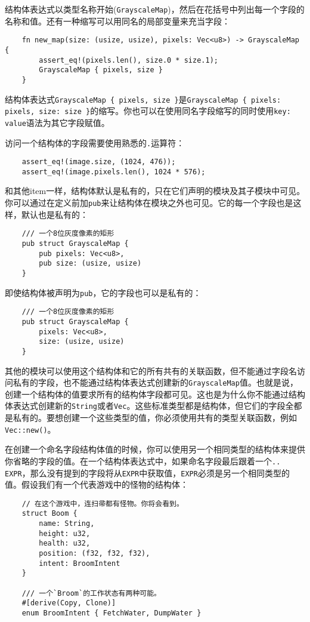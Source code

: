 结构体表达式以类型名称开始(\texttt{GrayscaleMap})，然后在花括号中列出每一个字段的名称和值。还有一种缩写可以用同名的局部变量来充当字段：
\begin{verbatim}
    fn new_map(size: (usize, usize), pixels: Vec<u8>) -> GrayscaleMap {
        assert_eq!(pixels.len(), size.0 * size.1);
        GrayscaleMap { pixels, size }
    }
\end{verbatim}

结构体表达式\texttt{GrayscaleMap \{ pixels, size \}}是\texttt{GrayscaleMap \{ pixels: pixels, size: size \}}的缩写。你也可以在使用同名字段缩写的同时使用\texttt{key: value}语法为其它字段赋值。

访问一个结构体的字段需要使用熟悉的\texttt{.}运算符：
\begin{verbatim}
    assert_eq!(image.size, (1024, 476));
    assert_eq!(image.pixels.len(), 1024 * 576);
\end{verbatim}

和其他item一样，结构体默认是私有的，只在它们声明的模块及其子模块中可见。你可以通过在定义前加\texttt{pub}来让结构体在模块之外也可见。它的每一个字段也是这样，默认也是私有的：
\begin{verbatim}
    /// 一个8位灰度像素的矩形
    pub struct GrayscaleMap {
        pub pixels: Vec<u8>,
        pub size: (usize, usize)
    }
\end{verbatim}

即使结构体被声明为\texttt{pub}，它的字段也可以是私有的：
\begin{verbatim}
    /// 一个8位灰度像素的矩形
    pub struct GrayscaleMap {
        pixels: Vec<u8>,
        size: (usize, usize)
    }
\end{verbatim}

其他的模块可以使用这个结构体和它的所有共有的关联函数，但不能通过字段名访问私有的字段，也不能通过结构体表达式创建新的\texttt{GrayscaleMap}值。也就是说，创建一个结构体的值要求所有的结构体字段都可见。这也是为什么你不能通过结构体表达式创建新的\texttt{String}或者\texttt{Vec}。这些标准类型都是结构体，但它们的字段全都是私有的。要想创建一个这些类型的值，你必须使用共有的类型关联函数，例如\texttt{Vec::new()}。

在创建一个命名字段结构体值的时候，你可以使用另一个相同类型的结构体来提供你省略的字段的值。在一个结构体表达式中，如果命名字段最后跟着一个\texttt{.. EXPR}，那么没有提到的字段将从\texttt{EXPR}中获取值，\texttt{EXPR}必须是另一个相同类型的值。假设我们有一个代表游戏中的怪物的结构体：
\begin{verbatim}
    // 在这个游戏中，连扫帚都有怪物。你将会看到。
    struct Boom {
        name: String,
        height: u32,
        health: u32,
        position: (f32, f32, f32),
        intent: BroomIntent
    }

    /// 一个`Broom`的工作状态有两种可能。
    #[derive(Copy, Clone)]
    enum BroomIntent { FetchWater, DumpWater }
\end{verbatim}

